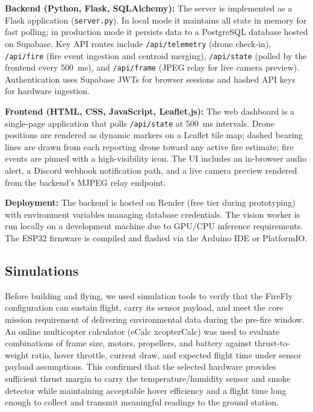 \documentclass[journal, onecolumn]{IEEEtran}
\begin{document}
\textbf{Backend (Python, Flask, SQLAlchemy):}
The server is implemented as a Flask application (\texttt{server.py}). In local mode it maintains all state in memory for fast polling; in production mode it persists data to a PostgreSQL database hosted on Supabase. Key API routes include \texttt{/api/telemetry} (drone check-in), \texttt{/api/fire} (fire event ingestion and centroid merging), \texttt{/api/state} (polled by the frontend every 500~ms), and \texttt{/api/frame} (JPEG relay for live camera preview). Authentication uses Supabase JWTs for browser sessions and hashed API keys for hardware ingestion.

\textbf{Frontend (HTML, CSS, JavaScript, Leaflet.js):}
The web dashboard is a single-page application that polls \texttt{/api/state} at 500~ms intervals. Drone positions are rendered as dynamic markers on a Leaflet tile map; dashed bearing lines are drawn from each reporting drone toward any active fire estimate; fire events are pinned with a high-visibility icon. The UI includes an in-browser audio alert, a Discord webhook notification path, and a live camera preview rendered from the backend's MJPEG relay endpoint.

\textbf{Deployment:}
The backend is hosted on Render (free tier during prototyping) with environment variables managing database credentials. The vision worker is run locally on a development machine due to GPU/CPU inference requirements. The ESP32 firmware is compiled and flashed via the Arduino IDE or PlatformIO.



\subsection{Simulations}

Before building and flying, we used simulation tools to verify that the FireFly configuration can sustain flight, carry its sensor payload, and meet the core mission requirement of delivering environmental data during the pre-fire window. An online multicopter calculator (eCalc xcopterCalc) was used to evaluate combinations of frame size, motors, propellers, and battery against thrust-to-weight ratio, hover throttle, current draw, and expected flight time under sensor payload assumptions. This confirmed that the selected hardware provides sufficient thrust margin to carry the temperature/humidity sensor and smoke detector while maintaining acceptable hover efficiency and a flight time long enough to collect and transmit meaningful readings to the ground station.
\end{document}
